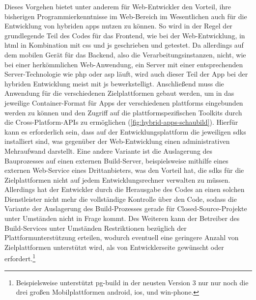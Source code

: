 Dieses Vorgehen bietet unter anderem für Web-Entwickler den Vorteil, ihre bisherigen Programmierkenntnisse im Web-Bereich im Wesentlichen auch für die Entwicklung von hybriden \glspl{app} nutzen zu können. 
So wird in der Regel der grundlegende Teil des Codes für das Frontend, wie bei der Web-Entwicklung, in \gls{html} in Kombination mit \gls{css} und \gls{js} geschrieben und getestet. 
Da allerdings auf dem mobilen Gerät für das Backend, also die Verarbeitungsinstanzen, nicht, wie bei einer herkömmlichen Web-Anwendung, ein Server mit einer entsprechenden Server-Technologie wie \gls{php} oder \gls{asp} läuft, wird auch dieser Teil der App bei der hybriden Entwicklung meist mit \gls{js} bewerkstelligt. 
Anschließend muss die Anwendung für die verschiedenen Zielplattformen gebaut werden, um in das jeweilige Container-Format für Apps der verschiedenen \glspl{plattform} eingebunden werden zu können und den Zugriff auf die plattformspezifischen Toolkits durch die Cross-Platform-APIs zu ermöglichen (\autoref{fig:hybrid-apps-schaubild}).
Hierfür kann es erforderlich sein, dass auf der Entwicklungsplattform die jeweiligen \glspl{sdk} installiert sind, was gegenüber der Web-Entwicklung einen administrativen Mehraufwand darstellt.
Eine andere Variante ist die Auslagerung des Bauprozesses auf einen externen Build-Server, beispielsweise mithilfe eines externen Web-Service eines Drittanbieters, was den Vorteil hat, die \glspl{sdk} für die Zielplattformen nicht auf jedem Entwicklungsrechner verwalten zu müssen. 
Allerdings hat der Entwickler durch die Herausgabe des Codes an einen solchen Dienstleister nicht mehr die vollständige Kontrolle über den Code, sodass die Variante der Auslagerung des Build-Prozesses gerade für Closed-Source-Projekte unter Umständen nicht in Frage kommt. 
Des Weiteren kann der Betreiber des Build-Services unter Umständen Restriktionen bezüglich der Plattformunterstützung erteilen, wodurch eventuell eine geringere Anzahl von Zielplattformen unterstützt wird, als von Entwicklerseite gewünscht oder erfordert.\footnote{Beispielsweise unterstützt \gls{pg-build} in der neusten Version 3 nur nur noch die drei großen Mobilplattformen \gls{android}, \gls{ios}, und \gls{win-phone}.}

